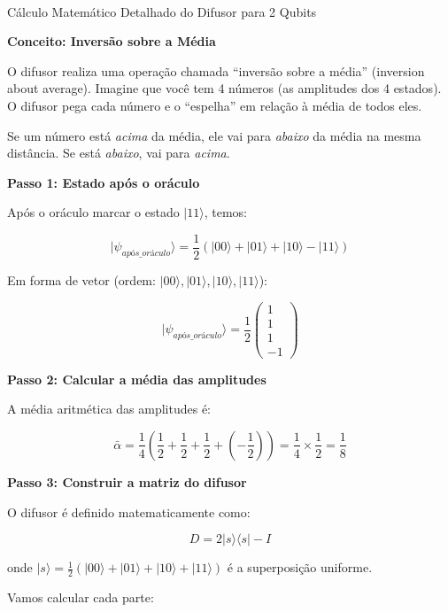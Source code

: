 \documentclass[
  brazilian,
]{report}
\makeatletter
\let\oldparagraph\paragraph
\renewcommand{\paragraph}{
    \@ifstar
      \xxxParagraphStar
      \xxxParagraphNoStar
  }
\newcommand{\xxxParagraphStar}[1]{\oldparagraph*{#1}\mbox{}}
\newcommand{\xxxParagraphNoStar}[1]{\oldparagraph{#1}\mbox{}}
\makeatother
\begin{document}
\paragraph{Cálculo Matemático Detalhado do Difusor para 2
Qubits}\label{cuxe1lculo-matemuxe1tico-detalhado-do-difusor-para-2-qubits}

\textbf{Conceito: Inversão sobre a Média}

O difusor realiza uma operação chamada ``inversão sobre a média''
(inversion about average). Imagine que você tem 4 números (as amplitudes
dos 4 estados). O difusor pega cada número e o ``espelha'' em relação à
média de todos eles.

Se um número está \emph{acima} da média, ele vai para \emph{abaixo} da
média na mesma distância. Se está \emph{abaixo}, vai para \emph{acima}.

\textbf{Passo 1: Estado após o oráculo}

Após o oráculo marcar o estado \(|11\rangle\), temos:

\[|\psi_{após\_oráculo}\rangle = \frac{1}{2}(|00\rangle + |01\rangle + |10\rangle - |11\rangle)\]

Em forma de vetor (ordem:
\(|00\rangle, |01\rangle, |10\rangle, |11\rangle\)):

\[|\psi_{após\_oráculo}\rangle = \frac{1}{2}\begin{pmatrix}1\\1\\1\\-1\end{pmatrix}\]

\textbf{Passo 2: Calcular a média das amplitudes}

A média aritmética das amplitudes é:

\[\bar{\alpha} = \frac{1}{4}\left(\frac{1}{2} + \frac{1}{2} + \frac{1}{2} + \left(-\frac{1}{2}\right)\right) = \frac{1}{4} \times \frac{1}{2} = \frac{1}{8}\]

\textbf{Passo 3: Construir a matriz do difusor}

O difusor é definido matematicamente como:

\[D = 2|s\rangle\langle s| - I\]

onde
\(|s\rangle = \frac{1}{2}(|00\rangle + |01\rangle + |10\rangle + |11\rangle)\)
é a superposição uniforme.

Vamos calcular cada parte:
\end{document}
